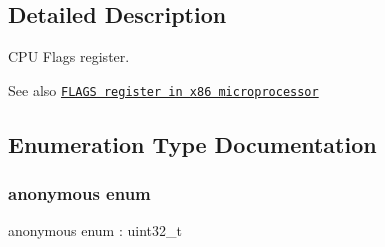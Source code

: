 \subsection{Detailed Description}
C\+PU Flags register. 

\begin{DoxySeeAlso}{See also}
\href{https://en.wikipedia.org/wiki/FLAGS_register}{\tt F\+L\+A\+GS register in x86 microprocessor} 
\end{DoxySeeAlso}


\subsection{Enumeration Type Documentation}
\mbox{\label{namespace_f_l_a_g_s_a9d5f9747a4879f4d57418def02a8fb51}} 
\subsubsection{\texorpdfstring{anonymous enum}{anonymous enum}}
{\footnotesize\ttfamily anonymous enum \+: uint32\+\_\+t}

